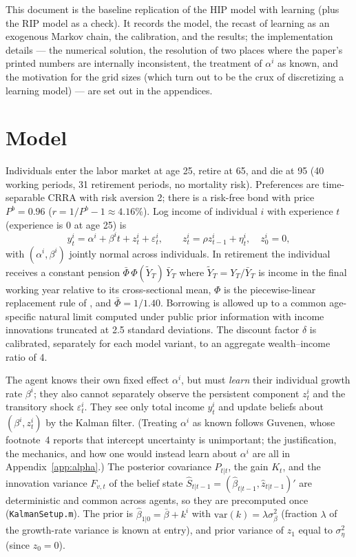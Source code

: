 \documentclass[11pt,fleqn]{article}
\begin{document}
This document is the baseline replication of the HIP model with learning (plus the RIP model as a check). It records the model, the recast of learning as an exogenous Markov chain, the calibration, and the results; the implementation details --- the numerical solution, the resolution of two places where the paper's printed numbers are internally inconsistent, the treatment of $\alpha^i$ as known, and the motivation for the grid sizes (which turn out to be the crux of discretizing a learning model) --- are set out in the appendices.

\section{Model}

Individuals enter the labor market at age 25, retire at 65, and die at 95 (40 working
periods, 31 retirement periods, no mortality risk). Preferences are time-separable
CRRA with risk aversion 2; there is a risk-free bond with price $P^b=0.96$
($r=1/P^b-1\approx 4.16\%$). Log income of individual $i$ with experience $t$
(experience is 0 at age 25) is
\begin{equation}
  y^i_t = \alpha^i + \beta^i t + z^i_t + \varepsilon^i_t, \qquad
  z^i_t = \rho z^i_{t-1} + \eta^i_t, \quad z^i_0=0,
\end{equation}
with $(\alpha^i,\beta^i)$ jointly normal across individuals. In retirement the
individual receives a constant pension $\bar{\Phi}\,\Phi(\tilde{Y}_T)\,\bar{Y}_T$ where
$\tilde{Y}_T=Y_T/\bar{Y}_T$ is income in the final working year relative to its
cross-sectional mean, $\Phi$ is the piecewise-linear replacement rule of
\cite{StoreslettenTelmerYaron2004}, and $\bar{\Phi}=1/1.40$. Borrowing is allowed up to
a common age-specific natural limit computed under public prior information with income
innovations truncated at 2.5 standard deviations. The discount factor $\delta$ is
calibrated, separately for each model variant, to an aggregate wealth--income ratio of 4.

The agent knows their own fixed effect $\alpha^i$, but must \emph{learn} their individual
growth rate $\beta^i$; they also cannot separately observe the persistent component
$z^i_t$ and the transitory shock $\varepsilon^i_t$. They see only total income $y^i_t$
and update beliefs about $(\beta^i, z^i_t)$ by the Kalman filter. (Treating $\alpha^i$ as
known follows Guvenen, whose footnote~4 reports that intercept uncertainty is
unimportant; the justification, the mechanics, and how one would instead learn about
$\alpha^i$ are all in Appendix~\ref{app:alpha}.) The posterior covariance $P_{t|t}$, the
gain $K_t$, and the innovation variance $F_{v,t}$ of the belief state
$\hat{S}_{t|t-1}=(\hat\beta_{t|t-1},\hat z_{t|t-1})'$ are deterministic and common across
agents, so they are precomputed once (\texttt{KalmanSetup.m}). The prior is
$\hat{\beta}_{1|0}=\bar{\beta}+k^i$ with $\mathrm{var}(k)=\lambda\sigma^2_\beta$
(fraction $\lambda$ of the growth-rate variance is known at entry), and prior variance of
$z_1$ equal to $\sigma^2_\eta$ (since $z_0=0$).
\end{document}
